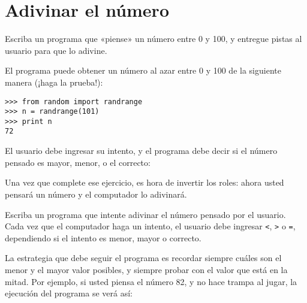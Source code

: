 \section{Adivinar el número}

Escriba un programa que «piense» un número entre 0 y 100, y entregue
pistas al usuario para que lo adivine.

El programa puede obtener un número al azar entre 0 y 100 de la
siguiente manera (¡haga la prueba!):

\begin{lstlisting}
>>> from random import randrange
>>> n = randrange(101)
>>> print n
72
\end{lstlisting}

El usuario debe ingresar su intento, y el programa debe decir si el
número pensado es mayor, menor, o el correcto:

Una vez que complete ese ejercicio, es hora de invertir los roles: ahora
usted pensará un número y el computador lo adivinará.

Escriba un programa que intente adivinar el número pensado por el
usuario. Cada vez que el computador haga un intento, el usuario debe
ingresar \lstinline!<!, \lstinline!>! o \lstinline!=!, dependiendo si el
intento es menor, mayor o correcto.

La estrategia que debe seguir el programa es recordar siempre cuáles son
el menor y el mayor valor posibles, y siempre probar con el valor que
está en la mitad. Por ejemplo, si usted piensa el número 82, y no hace
trampa al jugar, la ejecución del programa se verá así:
